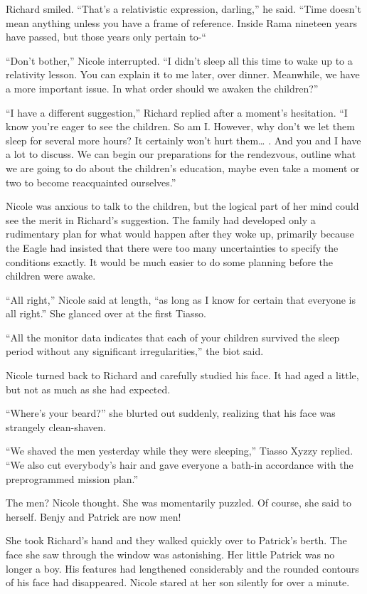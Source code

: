 \documentclass[]{article}
\begin{document}
{Richard smiled. “That’s a relativistic expression, darling,” he said. “Time doesn’t mean anything unless you have a frame of reference. Inside Rama nineteen years have passed, but those years only pertain to-“

“Don’t bother,” Nicole interrupted. “I didn’t sleep all this time to wake up to a relativity lesson. You can explain it to me later, over dinner. Meanwhile, we have a more important issue. In what order should we awaken the children?”

“I have a different suggestion,” Richard replied after a moment’s hesitation. “I know you’re eager to see the children. So am I. However, why don’t we let them sleep for several more hours? It certainly won’t hurt them… . And you and I have a lot to discuss. We can begin our preparations for the rendezvous, outline what we are going to do about the children’s education, maybe even take a moment or two to become reacquainted ourselves.”

Nicole was anxious to talk to the children, but the logical part of her mind could see the merit in Richard’s suggestion. The family had developed only a rudimentary plan for what would happen after they woke up, primarily because the Eagle had insisted that there were too many uncertainties to specify the conditions exactly. It would be much easier to do some planning before the children were awake.

“All right,” Nicole said at length, “as long as I know for certain that everyone is all right.” She glanced over at the first Tiasso.

“All the monitor data indicates that each of your children survived the sleep period without any significant irregularities,” the biot said.

Nicole turned back to Richard and carefully studied his face. It had aged a little, but not as much as she had expected.

“Where’s your beard?” she blurted out suddenly, realizing that his face was strangely clean-shaven.

“We shaved the men yesterday while they were sleeping,” Tiasso Xyzzy replied. “We also cut everybody’s hair and gave everyone a bath-in accordance with the preprogrammed mission plan.”

The men? Nicole thought. She was momentarily puzzled. Of course, she said to herself. Benjy and Patrick are now men!

She took Richard’s hand and they walked quickly over to Patrick’s berth. The face she saw through the window was astonishing. Her little Patrick was no longer a boy. His features had lengthened considerably and the rounded contours of his face had disappeared. Nicole stared at her son silently for over a minute.

}
\end{document}
